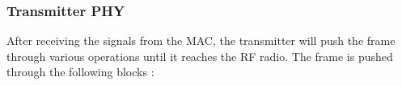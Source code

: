 \documentclass[10pt]{article}
\begin{document}
\subsubsection{Transmitter PHY}
After receiving the signals from the MAC, the transmitter will push the frame through various operations until it reaches the RF radio. 
The frame is pushed through the following blocks :
%
% 
% 
% 
% 
% 
% 
\end{document}
